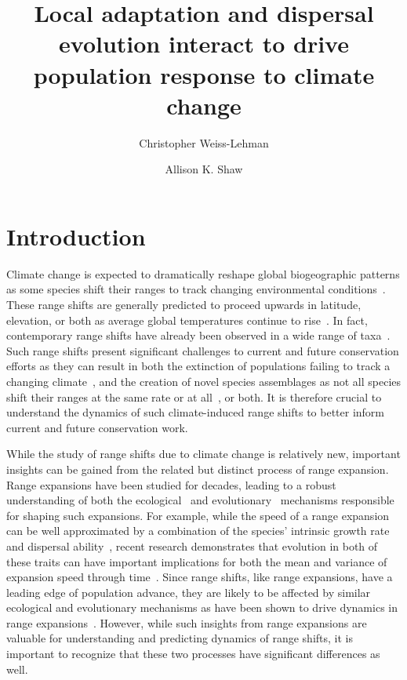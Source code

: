 \documentclass[11pt, oneside]{article}
\title{Local adaptation and dispersal evolution interact to drive population response to climate change}
\date{}
\author[1]{Christopher Weiss-Lehman}
\author[1]{Allison K. Shaw}
\affil[1]{Ecology, Evolution, and Behavior, University of Minnesota}
\begin{document}
\maketitle

\doublespacing
\linenumbers

\section{Introduction}
Climate change is expected to dramatically reshape global biogeographic patterns as some species shift their ranges to track changing environmental conditions~\citep{gonzalez2010global, penuelas2003global, hansen2001global, scholze2006climate}. These range shifts are generally predicted to proceed upwards in latitude, elevation, or both as average global temperatures continue to rise~\citep{loarie2009velocity}. In fact, contemporary range shifts have already been observed in a wide range of taxa~\citep{chen2011rapid, walther2002ecological, parmesan2003globally, parmesan2006ecological, parmesan1999poleward, perry2005climate}. Such range shifts present significant challenges to current and future conservation efforts as they can result in both the extinction of populations failing to track a changing climate~\citep{davis2001range, parmesan2006ecological, zhu2012failure, sekercioglu2008climate}, and the creation of novel species assemblages as not all species shift their ranges at the same rate or at all~\citep{hobbs2009novel, gilman2010framework, williams2007novel}, or both. It is therefore crucial to understand the dynamics of such climate-induced range shifts to better inform current and future conservation work.

While the study of range shifts due to climate change is relatively new, important insights can be gained from the related but distinct process of range expansion. Range expansions have been studied for decades, leading to a robust understanding of both the ecological~\citep{skellam1951random, hastings2005spatial} and evolutionary~\citep{shine2011evolutionary, burton2010trade, excoffier2009genetic, kubisch2014and} mechanisms responsible for shaping such expansions. For example, while the speed of a range expansion can be well approximated by a combination of the species' intrinsic growth rate and dispersal ability~\citep{hastings2005spatial}, recent research demonstrates that evolution in both of these traits can have important implications for both the mean and variance of expansion speed through time~\citep{weiss2017rapid, ochocki2017rapid, szHucs2017rapid, phillips2015evolutionary, shaw2015dispersal}. Since range shifts, like range expansions, have a leading edge of population advance, they are likely to be affected by similar ecological and evolutionary mechanisms as have been shown to drive dynamics in range expansions~\citep{hargreaves2014evolution}. However, while such insights from range expansions are valuable for understanding and predicting dynamics of range shifts, it is important to recognize that these two processes have significant differences as well.
\end{document}
